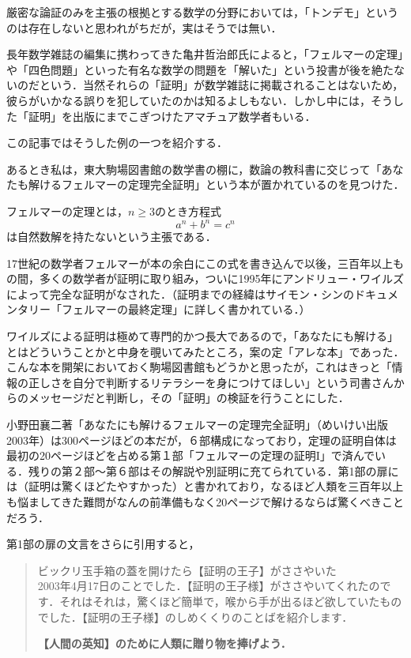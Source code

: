 
厳密な論証のみを主張の根拠とする数学の分野においては，「トンデモ」というのは存在しないと思われがちだが，実はそうでは無い．

長年数学雑誌の編集に携わってきた亀井哲治郎氏によると，「フェルマーの定理」や「四色問題」といった有名な数学の問題を「解いた」という投書が後を絶たないのだという．当然それらの「証明」が数学雑誌に掲載されることはないため，彼らがいかなる誤りを犯していたのかは知るよしもない．しかし中には，そうした「証明」を出版にまでこぎつけたアマチュア数学者もいる．

この記事ではそうした例の一つを紹介する．

あるとき私は，東大駒場図書館の数学書の棚に，数論の教科書に交じって「あなたも解けるフェルマーの定理完全証明」という本が置かれているのを見つけた．

フェルマーの定理とは，$n\geq 3$のとき方程式
\[a^n+b^n=c^n\]
は自然数解を持たないという主張である．

17世紀の数学者フェルマーが本の余白にこの式を書き込んで以後，三百年以上もの間，多くの数学者が証明に取り組み，ついに1995年にアンドリュー・ワイルズによって完全な証明がなされた．（証明までの経緯はサイモン・シンのドキュメンタリー「フェルマーの最終定理」に詳しく書かれている．）

ワイルズによる証明は極めて専門的かつ長大であるので，「あなたにも解ける」とはどういうことかと中身を覗いてみたところ，案の定「アレな本」であった．こんな本を開架においておく駒場図書館もどうかと思ったが，これはきっと「情報の正しさを自分で判断するリテラシーを身につけてほしい」という司書さんからのメッセージだと判断し，その「証明」の検証を行うことにした．


小野田襄二著「あなたにも解けるフェルマーの定理完全証明」（めいけい出版　2003年）は300ページほどの本だが，６部構成になっており，定理の証明自体は最初の20ページほどを占める第１部「フェルマーの定理の証明I」で済んでいる．残りの第２部～第６部はその解説や別証明に充てられている．第1部の扉には（証明は驚くほどたやすかった）と書かれており，なるほど人類を三百年以上も悩ましてきた難問がなんの前準備もなく20ページで解けるならば驚くべきことだろう．

第1部の扉の文言をさらに引用すると，

\begin{quotation}
ビックリ玉手箱の蓋を開けたら【証明の王子】がささやいた\\

2003年4月17日のことでした．【証明の王子様】がささやいてくれたのです．それはそれは，驚くほど簡単で，喉から手が出るほど欲していたものでした．【証明の王子様】のしめくくりのことばを紹介します．
\begin{center}
\textbf{【人間の英知】のために人類に贈り物を捧げよう．}
\end{center}
\end{quotation}

